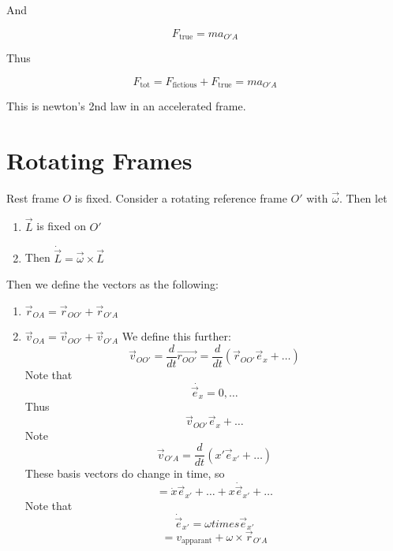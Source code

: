 \documentclass{article}
\newtheorem{one minute paper}[theorem]{One Minute Paper}
\begin{document}
And 

\begin{equation}
    F_{\text{true}} = ma_{O'A}
\end{equation}

Thus 

\begin{equation}
    F_{\text{tot}} = F_{\text{fictious}} + F_{\text{true}} = ma_{O'A}
\end{equation}

This is newton's 2nd law in an accelerated frame. 

\section*{Rotating Frames}

Rest frame $O$ is fixed. Consider a rotating reference frame $O'$ with $\vec{\omega}$. Then let 
\begin{enumerate}
    \item $\vec{L}$ is fixed on $O'$
    \item Then $\dot{\vec{L}} = \vec{\omega}\times \vec{L}$
\end{enumerate}

Then we define the vectors as the following:
\begin{enumerate}
    \item $\vec{r}_{OA} = \vec{r}_{OO'} + \vec{r}_{O'A}$ 
    \item $\vec{v}_{OA} = \vec{v}_{OO'} + \vec{v}_{O'A}$
    We define this further:
    \begin{equation}
        \vec{v}_{OO'} = \frac{d}{dt}\vec{r_{OO'}} = \frac{d}{dt}(\vec{r}_{OO'}\vec{e}_x + \dots)
    \end{equation} 
    Note that 
    \begin{equation}
        \dot{\vec{e}_x} = 0, \dots
    \end{equation}
    Thus 
    \begin{equation}
        \vec{v}_{OO'}\vec{e}_x + \dots
    \end{equation}
    Note 
    \begin{equation}
        \vec{v}_{O'A} = \frac{d}{dt}(x'\vec{e}_{x'} + \dots)
    \end{equation}
    These basis vectors do change in time, so 
    \begin{equation}
        = \dot{x}\vec{e}_{x'} + \dots + x\dot{\vec{e}}_{x'} + \dots 
    \end{equation}
    Note that 
    \begin{equation}
        \dot{\vec{e}}_{x'} = \omega times \vec{e}_{x'}
    \end{equation}
    \begin{equation}
         = v_{\text{apparant}} + \omega \times \vec{r}_{O'A}
    \end{equation}
\end{enumerate}
\end{document}
